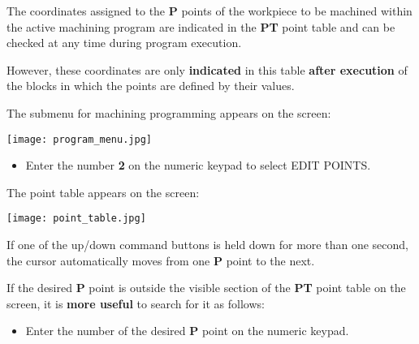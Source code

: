 The coordinates assigned to the \textbf{P} points of the workpiece to be machined within the active machining program are indicated in the \textbf{PT} point table and can be checked at any time during program execution.

However, these coordinates are only \textbf{indicated} in this table \textbf{after execution} of the blocks in which the points are defined by their values.

\procedure

\begin{itemize}
\end{itemize}
\vspace{.5cm}
\begin{itemize}
\end{itemize}

The submenu for machining programming appears on the screen:

\begin{center}
    \texttt{[image: program\_menu.jpg]}
\end{center}

\newpage
\begin{itemize}
    \item Enter the number \textbf{2} on the numeric keypad to select EDIT POINTS.
\end{itemize}

The point table appears on the screen:

\begin{center}
    \texttt{[image: point\_table.jpg]}
\end{center}

\begin{itemize}
\end{itemize}

If one of the up/down command buttons is held down for more than one second, the cursor automatically moves from one \textbf{P} point to the next.

If the desired \textbf{P} point is outside the visible section of the \textbf{PT} point table on the screen, it is \textbf{more useful} to search for it as follows:

\begin{itemize}
    \item Enter the number of the desired \textbf{P} point on the numeric keypad.
\end{itemize}

